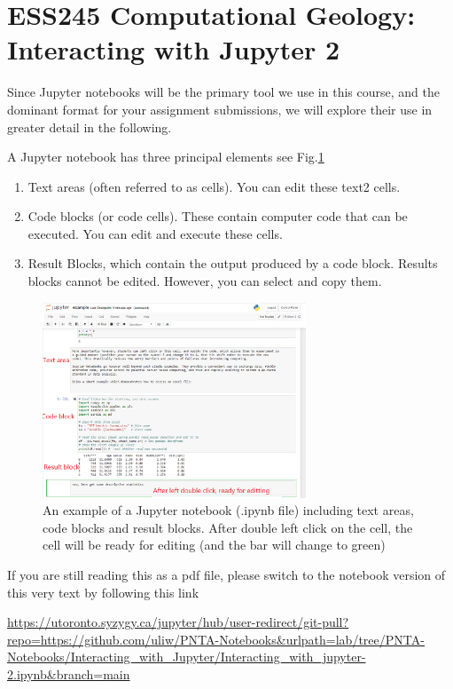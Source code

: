 \documentclass[svgnames, 11pt, lettersize]{article}
\author{Uli Wortmann}
\date{\today}
\title{}
\begin{document}
\section{ESS245 Computational Geology: Interacting with Jupyter 2}
\label{sec:org45aa475}
Since Jupyter notebooks will be the primary tool we use in this
course, and the dominant format for your assignment submissions, we
will explore their use in greater detail in the following.

A Jupyter notebook has three principal elements see Fig.\ref{nbexample}

\begin{enumerate}
\item Text areas (often referred to as cells). You can edit these text2 cells.
\item Code blocks (or code cells). These contain computer code that can
be executed. You can edit and execute these cells.
\item Result Blocks, which contain the output produced by a code
block. Results blocks cannot be edited. However, you can select and
copy them.
\end{enumerate}
\begin{figure}[htbp]
\centering
\includegraphics[width=0.7\textwidth]{./Tianshi/TL-fig-003.png}
\caption{\label{nbexample}An example of a Jupyter notebook (.ipynb file) including text areas, code blocks and result blocks. After double left click on the cell, the cell will be ready for editing (and the bar will change to green)}
\end{figure}

If you are still reading this as a pdf file, please switch to the notebook
version of this very text by following this link

\url{https://utoronto.syzygy.ca/jupyter/hub/user-redirect/git-pull?repo=https://github.com/uliw/PNTA-Notebooks\&urlpath=lab/tree/PNTA-Notebooks/Interacting\_with\_Jupyter/Interacting\_with\_jupyter-2.ipynb\&branch=main}
\end{document}
